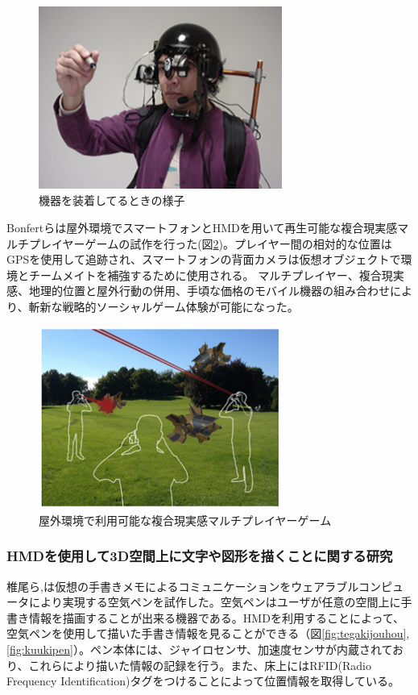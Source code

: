 \documentclass[11pt,a4j, titlepage]{jarticle} %
\begin{document}
\begin{figure}[H]
  \begin{center}
    \includegraphics[clip,height=6.0cm,width=8.0cm]{./informal2.eps}
    \caption{機器を装着してるときの様子}
    \label{fig:informal2}
  \end{center}
\end{figure}

Bonfertら\cite{bonfert}は屋外環境でスマートフォンとHMDを用いて再生可能な複合現実感マルチプレイヤーゲームの試作を行った(図\ref{fig:augmented_invaders})。プレイヤー間の相対的な位置はGPSを使用して追跡され、スマートフォンの背面カメラは仮想オブジェクトで環境とチームメイトを補強するために使用される。 マルチプレイヤー、複合現実感、地理的位置と屋外行動の併用、手頃な価格のモバイル機器の組み合わせにより、斬新な戦略的ソーシャルゲーム体験が可能になった。

\begin{figure}[H]
  \begin{center}
    \includegraphics[clip,height=6.0cm,width=8.0cm]{./augmented_invaders.eps}
    \caption{屋外環境で利用可能な複合現実感マルチプレイヤーゲーム}
    \label{fig:augmented_invaders}
  \end{center}
\end{figure}

\subsubsection{HMDを使用して3D空間上に文字や図形を描くことに関する研究}
椎尾ら\cite{siio},\cite{siio2}は仮想の手書きメモによるコミュニケーションをウェアラブルコンピュータにより実現する空気ペンを試作した。空気ペンはユーザが任意の空間上に手書き情報を描画することが出来る機器である。HMDを利用することによって、空気ペンを使用して描いた手書き情報を見ることができる（図\ref{fig:tegakijouhou}, \ref{fig:kuukipen}）。ペン本体には、ジャイロセンサ、加速度センサが内蔵されており、これらにより描いた情報の記録を行う。また、床上にはRFID(Radio Frequency Identification)タグをつけることによって位置情報を取得している。
\end{document}
